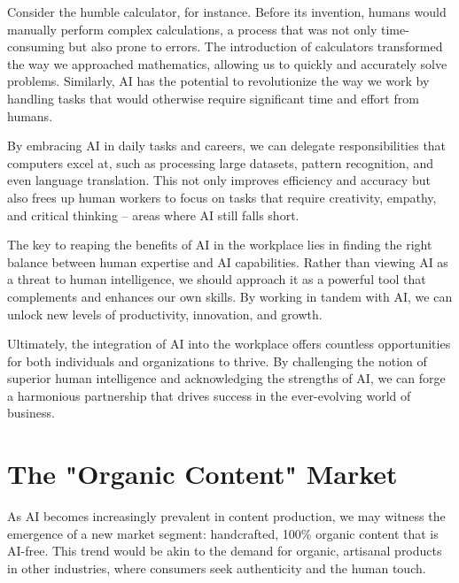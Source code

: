 Consider the humble calculator, for instance. Before its invention, humans would manually perform complex calculations, a process that was not only time-consuming but also prone to errors. The introduction of calculators transformed the way we approached mathematics, allowing us to quickly and accurately solve problems. Similarly, AI has the potential to revolutionize the way we work by handling tasks that would otherwise require significant time and effort from humans.

By embracing AI in daily tasks and careers, we can delegate responsibilities that computers excel at, such as processing large datasets, pattern recognition, and even language translation. This not only improves efficiency and accuracy but also frees up human workers to focus on tasks that require creativity, empathy, and critical thinking – areas where AI still falls short.

The key to reaping the benefits of AI in the workplace lies in finding the right balance between human expertise and AI capabilities. Rather than viewing AI as a threat to human intelligence, we should approach it as a powerful tool that complements and enhances our own skills. By working in tandem with AI, we can unlock new levels of productivity, innovation, and growth.

Ultimately, the integration of AI into the workplace offers countless opportunities for both individuals and organizations to thrive. By challenging the notion of superior human intelligence and acknowledging the strengths of AI, we can forge a harmonious partnership that drives success in the ever-evolving world of business.

\section{The "Organic Content" Market}

As AI becomes increasingly prevalent in content production, we may witness the emergence of a new market segment: handcrafted, 100\% organic content that is AI-free. This trend would be akin to the demand for organic, artisanal products in other industries, where consumers seek authenticity and the human touch.

